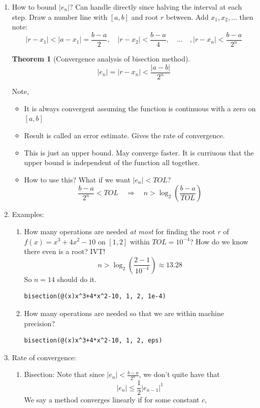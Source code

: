 \documentclass{article}
\newcommand{\ds}{\displaystyle}
\newtheorem{thm}{Theorem}[section]
\theoremstyle{remark}
\begin{document}
\begin{enumerate}
\item How to bound $|e_n|$? Can handle directly since halving the interval at each step. Draw a number line with $[a,b]$ and root $r$ between. Add $x_1,x_2,\dots $ then note:
\[
|r-x_1| < |a-x_1| = \frac{b-a}{2}, \quad |r-x_2| < \frac{b-a}{4},\quad \dots \quad, |r-x_n| < \frac{b-a}{2^n} 
\]
\begin{thm}[Convergence analysis of bisection method]
$$
|e_n| = |r-x_n| < \frac{|a-b|}{2^n}
$$
\end{thm}
Note,
\begin{itemize}
\item It is always convergent assuming the function is continuous with a zero on $[a,b]$
\item Result is called an error estimate. Gives the rate of convergence. 
\item This is just an upper bound. May converge faster. It is curriuous that the upper bound is independent of the function all together.
\item How to use this? What if we want $|e_n| < TOL$?
\[
\frac{b-a}{2^n} < TOL \quad \Rightarrow \quad n> \log_2\left(\frac{b-a}{TOL}\right)
\]
\end{itemize}
\item Examples: 
\begin{enumerate}
\item How many operations are needed \emph{at most} for finding the root $r$ of $f(x)=x^3+4x^2-10$ on $[1,2]$ within $TOL=10^{-4}$? How do we know there even is a root? IVT!
\[
n > \log_2\left(\frac{2-1}{10^{-4}}\right) \approx 13.28
\]
So $n=14$ should do it.
\begin{verbatim}
bisection(@(x)x^3+4*x^2-10, 1, 2, 1e-4)
\end{verbatim}
\item How many operations are needed so that we are within machine precision?
\begin{verbatim}
bisection(@(x)x^3+4*x^2-10, 1, 2, eps)
\end{verbatim}
\end{enumerate}
\item Rate of convergence:
\begin{enumerate}
\item Bisection: Note that since $\ds |e_n| < \frac{b-a}{2^n}$, we don't quite have that
\[
|e_n| \leq \frac{1}{2} |e_{n-1}|^1
\]
We say a method converges linearly if for some constant $c$, 

\end{enumerate}
\end{enumerate}
\end{document}
